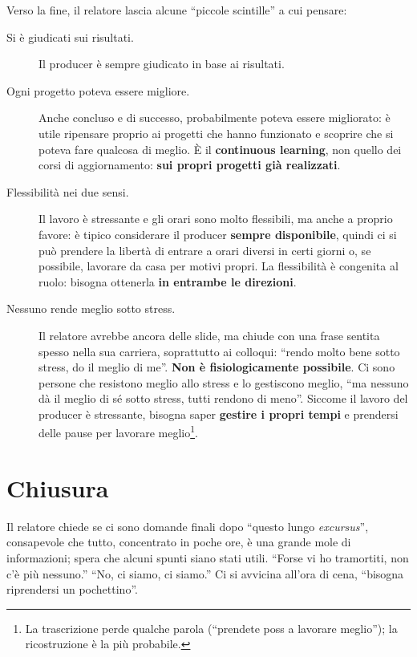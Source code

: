 Verso la fine, il relatore lascia alcune ``piccole scintille'' a cui pensare:
\begin{description}
  \item[Si è giudicati sui risultati.] Il producer è sempre giudicato in base ai
        risultati.
  \item[Ogni progetto poteva essere migliore.] Anche concluso e di successo,
        probabilmente poteva essere migliorato: è utile ripensare proprio ai
        progetti che hanno funzionato e scoprire che si poteva fare qualcosa di
        meglio. È il \textbf{continuous learning}, non quello dei corsi di
        aggiornamento: \textbf{sui propri progetti già realizzati}.
  \item[Flessibilità nei due sensi.] Il lavoro è stressante e gli orari sono
        molto flessibili, ma anche a proprio favore: è tipico considerare il
        producer \textbf{sempre disponibile}, quindi ci si può prendere la
        libertà di entrare a orari diversi in certi giorni o, se possibile,
        lavorare da casa per motivi propri. La flessibilità è congenita al ruolo:
        bisogna ottenerla \textbf{in entrambe le direzioni}.
  \item[Nessuno rende meglio sotto stress.] Il relatore avrebbe ancora delle
        slide, ma chiude con una frase sentita spesso nella sua carriera,
        soprattutto ai colloqui: ``rendo molto bene sotto stress, do il meglio
        di me''. \textbf{Non è fisiologicamente possibile}. Ci sono persone che
        resistono meglio allo stress e lo gestiscono meglio, ``ma nessuno dà il
        meglio di sé sotto stress, tutti rendono di meno''. Siccome il lavoro del
        producer è stressante, bisogna saper \textbf{gestire i propri tempi} e
        prendersi delle pause per lavorare meglio\footnote{La trascrizione perde
        qualche parola (``prendete poss a lavorare meglio''); la ricostruzione
        è la più probabile.}.
\end{description}

\section{Chiusura}
\label{sec:z5-chiusura}

Il relatore chiede se ci sono domande finali dopo ``questo lungo
\emph{excursus}'', consapevole che tutto, concentrato in poche ore, è una
grande mole di informazioni; spera che alcuni spunti siano stati utili.
``Forse vi ho tramortiti, non c'è più nessuno.'' ``No, ci siamo, ci siamo.''
Ci si avvicina all'ora di cena, ``bisogna riprendersi un pochettino''.


